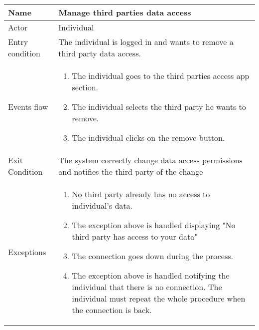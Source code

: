 \begin{tabular}{|l|p{13cm}|}
    \hline
    Name & Manage third parties data access
    \\ \hline
    Actor & Individual
    \\ \hline 
    Entry condition & The individual is logged in and wants to remove a third party data access.
        \\ \hline
    Events flow &
    \begin{enumerate}
	\item The individual goes to the third parties access app section.
    \item The individual selects the third party he wants to remove.
    \item The individual clicks on the remove button.
    \end{enumerate}
     \\ \hline
     Exit Condition & The system correctly change data access permissions and notifies the third party of the change
     \\
    \hline
    Exceptions &
        \begin{enumerate}
    \item No third party already has no access to individual's data.
    \item The exception above is handled displaying "No third party has access to your data"
    \item The connection goes down during the process. 
    \item The exception above is handled notifying the individual that there is no connection. The individual must repeat the whole procedure when the connection is back.
    \end{enumerate}
      \\
\end{tabular}

